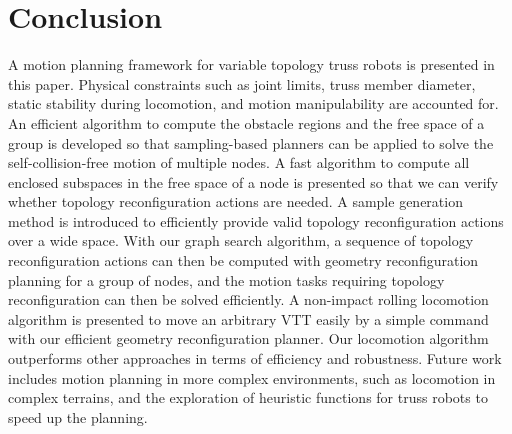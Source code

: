 \documentclass[journal]{IEEEtran}
\begin{document}
\section{Conclusion}
\label{sec:conclusion}

A motion planning framework for variable topology truss robots is
presented in this paper. Physical constraints such as joint limits,
truss member diameter, static stability during locomotion, and motion
manipulability are accounted for. An efficient algorithm to compute
the obstacle regions and the free space of a group is developed so
that sampling-based planners can be applied to solve the
self-collision-free motion of multiple nodes. A fast algorithm to
compute all enclosed subspaces in the free space of a node is
presented so that we can verify whether topology reconfiguration
actions are needed. A sample generation method is introduced to
efficiently provide valid topology reconfiguration actions over a wide
space. With our graph search algorithm, a sequence of topology
reconfiguration actions can then be computed with geometry
reconfiguration planning for a group of nodes, and the motion tasks
requiring topology reconfiguration can then be solved efficiently. A
non-impact rolling locomotion algorithm is presented to move an
arbitrary VTT easily by a simple command with our efficient geometry
reconfiguration planner. Our locomotion algorithm outperforms other
approaches in terms of efficiency and robustness. Future work includes
motion planning in more complex environments, such as locomotion in
complex terrains, and the exploration of heuristic functions for truss
robots to speed up the planning.


\ifCLASSOPTIONcaptionsoff
  \newpage
\fi





%
%
%
\end{document}
